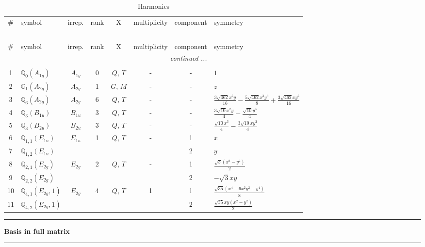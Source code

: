 \documentclass[fleqn,10pt,landscape]{jsarticle}
\begin{document}
\renewcommand{\arraystretch}{1.6}
\begin{longtable}[l]{clcccccl}
\captionsetup{justification=raggedright, singlelinecheck=off}
\caption{Harmonics}
 \\
 \hline \hline
\# & symbol & irrep. & rank & X & multiplicity & component & symmetry \\ \hline \endfirsthead

\multicolumn{7}{l}{\tablename\ \thetable{}} \\
 \hline \hline
\# & symbol & irrep. & rank & X & multiplicity & component & symmetry \\ \hline \endhead

 \hline \hline
\multicolumn{7}{r}{\footnotesize\it continued ...} \\ \endfoot

 \hline \hline
\multicolumn{7}{r}{} \\ \endlastfoot

1 & $\mathbb{Q}_{0}(A_{1g})$ & $A_{1g}$ & 0 & $Q$, $T$ & - & - & $1$ \\ \hline
2 & $\mathbb{G}_{1}(A_{2g})$ & $A_{2g}$ & 1 & $G$, $M$ & - & - & $z$ \\ \hline
3 & $\mathbb{Q}_{6}(A_{2g})$ & $A_{2g}$ & 6 & $Q$, $T$ & - & - & $\frac{3 \sqrt{462} x^{5} y}{16} - \frac{5 \sqrt{462} x^{3} y^{3}}{8} + \frac{3 \sqrt{462} x y^{5}}{16}$ \\ \hline
4 & $\mathbb{Q}_{3}(B_{1u})$ & $B_{1u}$ & 3 & $Q$, $T$ & - & - & $\frac{3 \sqrt{10} x^{2} y}{4} - \frac{\sqrt{10} y^{3}}{4}$ \\ \hline
5 & $\mathbb{Q}_{3}(B_{2u})$ & $B_{2u}$ & 3 & $Q$, $T$ & - & - & $\frac{\sqrt{10} x^{3}}{4} - \frac{3 \sqrt{10} x y^{2}}{4}$ \\ \hline
6 & $\mathbb{Q}_{1,1}(E_{1u})$ & $E_{1u}$ & 1 & $Q$, $T$ & - & 1 & $x$ \\
7 & $\mathbb{Q}_{1,2}(E_{1u})$ &  &  &  &  & 2 & $y$ \\ \hline
8 & $\mathbb{Q}_{2,1}(E_{2g})$ & $E_{2g}$ & 2 & $Q$, $T$ & - & 1 & $\frac{\sqrt{3} \left(x^{2} - y^{2}\right)}{2}$ \\
9 & $\mathbb{Q}_{2,2}(E_{2g})$ &  &  &  &  & 2 & $- \sqrt{3} x y$ \\ \hline
10 & $\mathbb{Q}_{4,1}(E_{2g},1)$ & $E_{2g}$ & 4 & $Q$, $T$ & 1 & 1 & $\frac{\sqrt{35} \left(x^{4} - 6 x^{2} y^{2} + y^{4}\right)}{8}$ \\
11 & $\mathbb{Q}_{4,2}(E_{2g},1)$ &  &  &  &  & 2 & $\frac{\sqrt{35} x y \left(x^{2} - y^{2}\right)}{2}$ \\
\end{longtable}
\vspace{5mm}
\noindent \rule[0.5mm]{5mm}{0.5mm}\hspace{3mm}\textbf{Basis in full matrix}\hspace{3mm}\leaders\hrule height 0.5mm\hfill\kern0pt
\vspace{3mm}
\end{document}
